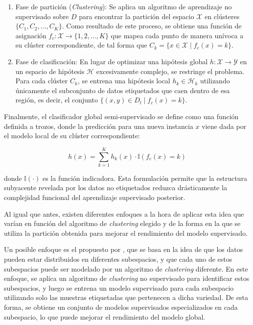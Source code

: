 \begin{enumerate}
    \item Fase de partición (\textit{Clustering}): Se aplica un algoritmo de aprendizaje no supervisado sobre $D$ para encontrar la partición del espacio $\mathcal{X}$ en clústeres $\{C_1, C_2, \dots, C_K\}$. Como resultado de este proceso, se obtiene una función de asignación $f_c: \mathcal{X} \rightarrow \{1, 2, \dots, K\}$ que mapea cada punto de manera unívoca a su clúster correspondiente, de tal forma que $C_k = \{x \in \mathcal{X} \mid f_c(x) = k\}$.

    \item Fase de clasificación: En lugar de optimizar una hipótesis global $h: \mathcal{X} \rightarrow \mathcal{Y}$ en un espacio de hipótesis $\mathcal{H}$ excesivamente complejo, se restringe el problema. Para cada clúster $C_k$, se entrena una hipótesis local $h_k \in \mathcal{H}_k$ utilizando únicamente el subconjunto de datos etiquetados que caen dentro de esa región, es decir, el conjunto $\{(x,y) \in D_l \mid f_c(x) = k\}$.
\end{enumerate}

Finalmente, el clasificador global semi-supervisado se define como una función definida a trozos, donde la predicción para una nueva instancia $x$ viene dada por el modelo local de su clúster correspondiente:

\begin{equation}
    h(x) = \sum_{k=1}^K h_k(x) \cdot \mathbb{I}(f_c(x) = k)
\end{equation}

donde $\mathbb{I}(\cdot)$ es la función indicadora. Esta formulación permite que la estructura subyacente revelada por los datos no etiquetados reduzca drásticamente la complejidad funcional del aprendizaje supervisado posterior.

Al igual que antes, existen diferentes enfoques a la hora de aplicar esta idea que varían en función del algoritmo de \textit{clustering} elegido y de la forma en la que se utiliza la partición obtenida para mejorar el rendimiento del modelo supervisado.

Un posible enfoque es el propuesto por \citet{pmlr-v5-goldberg09a}, que se basa en la idea de que los datos pueden estar distribuidos en diferentes subespacios, y que cada uno de estos subespacios puede ser modelado por un algoritmo de \textit{clustering} diferente. En este enfoque, se aplica un algoritmo de \textit{clustering} no supervisado para identificar estos subespacios, y luego se entrena un modelo supervisado para cada subespacio utilizando solo las muestras etiquetadas que pertenecen a dicha variedad. De esta forma, se obtiene un conjunto de modelos supervisados especializados en cada subespacio, lo que puede mejorar el rendimiento del modelo global.

